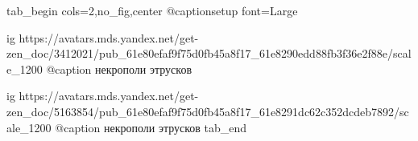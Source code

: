  
 
 
 
 

\ifcmt
tab_begin cols=2,no_fig,center
	@captionsetup font=Large

  ig https://avatars.mds.yandex.net/get-zen_doc/3412021/pub_61e80efaf9f75d0fb45a8f17_61e8290edd88fb3f36e2f88e/scale_1200
  @caption некрополи этрусков

	ig https://avatars.mds.yandex.net/get-zen_doc/5163854/pub_61e80efaf9f75d0fb45a8f17_61e8291dc62c352dcdeb7892/scale_1200
  @caption некрополи этрусков
tab_end
\fi
